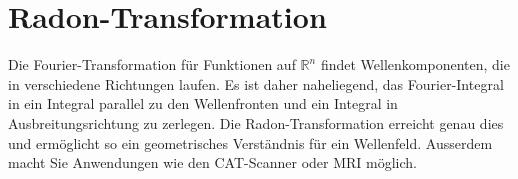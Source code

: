 %
%
%
\chapter{Radon-Transformation
\label{buch:chapter:radon}}
Die Fourier-Transformation für Funktionen auf $\mathbb{R}^n$ findet
Wellenkomponenten, die in verschiedene Richtungen laufen. 
Es ist daher naheliegend, das Fourier-Integral in
ein Integral parallel zu den Wellenfronten und ein Integral in 
Ausbreitungsrichtung zu zerlegen.
Die Radon-Transformation erreicht genau dies und ermöglicht so
ein geometrisches Verständnis für ein Wellenfeld.
Ausserdem macht Sie Anwendungen wie den CAT-Scanner oder 
MRI möglich.






